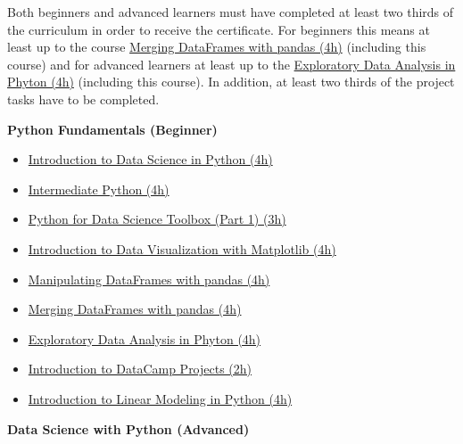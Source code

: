 \documentclass[
  11pt,
]{book}
\providecommand{\tightlist}{%
  \setlength{\itemsep}{0pt}\setlength{\parskip}{0pt}}
\newenvironment{tipsp}[1]
  {
  \begin{itemize}
  \footnotesize
  \renewcommand{\labelitemi}{
    \raisebox{-.7\height}[0pt][0pt]{
      {\setkeys{Gin}{width=3em,keepaspectratio}
        \texttt{[image: images/\#1.png]}}
    }
  }
  \setlength{\fboxsep}{1em}
  \begin{pbox}
  \item
  }
  {
  \end{pbox}
  \end{itemize}
  }
\begin{document}
Both beginners and advanced learners must have completed at least two thirds of the curriculum in order to receive the certificate. For beginners this means at least up to the course \href{https://learn.datacamp.com/courses/merging-dataframes-with-pandas}{Merging DataFrames with pandas (4h)} (including this course) and for advanced learners at least up to the \href{https://learn.datacamp.com/courses/exploratory-data-analysis-in-python}{Exploratory Data Analysis in Phyton (4h)} (including this course). In addition, at least two thirds of the project tasks have to be completed.

\begin{tipsp}p

\textbf{Python Fundamentals (Beginner) }

\begin{itemize}
\tightlist
\item
  \href{https://www.datacamp.com/courses/introduction-to-data-science-in-python}{Introduction to Data Science in Python (4h)}
\item
  \href{https://www.datacamp.com/courses/intermediate-python-for-data-science}{Intermediate Python (4h)}
\item
  \href{https://www.datacamp.com/courses/python-data-science-toolbox-part-1}{Python for Data Science Toolbox (Part 1) (3h)}
\item
  \href{https://www.datacamp.com/courses/introduction-to-matplotlib}{Introduction to Data Visualization with Matplotlib (4h)}
\item
  \href{https://www.datacamp.com/courses/manipulating-dataframes-with-pandas}{Manipulating DataFrames with pandas (4h)}
\item
  \href{https://www.datacamp.com/courses/merging-dataframes-with-pandas}{Merging DataFrames with pandas (4h)}
\item
  \href{https://www.datacamp.com/courses/exploratory-data-analysis-in-python}{Exploratory Data Analysis in Phyton (4h)}
\item
  \href{https://www.datacamp.com/projects/33}{Introduction to DataCamp Projects (2h)}
\item
  \href{https://www.datacamp.com/courses/introduction-to-linear-modeling-in-python}{Introduction to Linear Modeling in Python (4h)}
\end{itemize}

\textbf{Data Science with Python (Advanced) }


\end{tipsp}
\end{document}
